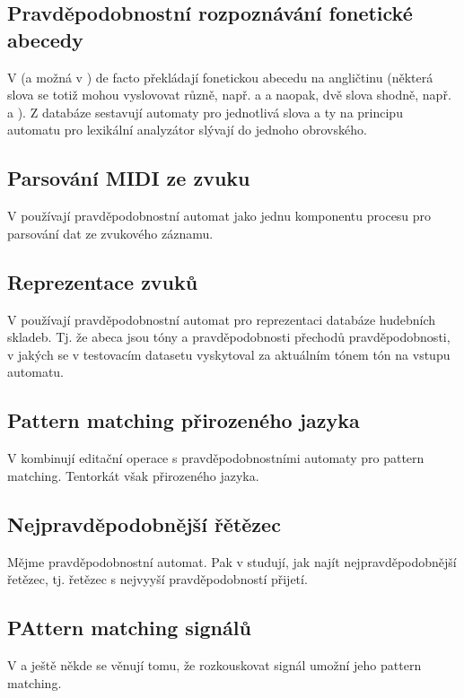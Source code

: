 \documentclass[a4paper,10pt]{article}
\begin{document}
\subsection{Pravděpodobnostní rozpoznávání fonetické abecedy}
V \cite{MohPerRoe-WeiFinStaTraSpeRec} (a možná v \cite{BahJel-DecChaWinDelSubApSpeRec}) de facto překládají fonetickou abecedu na angličtinu (některá slova se totiž mohou vyslovovat  různě, např.  a  a naopak, dvě slova shodně, např.  a ). Z databáze sestavují automaty pro jednotlivá slova a ty na principu automatu pro lexikální analyzátor slývají do jednoho obrovského.

\subsection{Parsování MIDI ze zvuku}
V \cite{ForBel-GenMusAccUsFinStaTra} používají pravděpodobnostní automat jako jednu komponentu procesu pro parsování  dat ze zvukového záznamu.

\subsection{Reprezentace zvuků}
V \cite{OliWag-ComMusNeuNetProFiStMa} používají pravděpodobnostní automat pro reprezentaci databáze hudebních skladeb. Tj. že abeca jsou tóny a pravděpodobnosti přechodů pravděpodobnosti, v jakých se v testovacím datasetu vyskytoval za aktuálním tónem tón na vstupu automatu.



\subsection{Pattern matching přirozeného jazyka}
V \cite{WaMan-ProFiStMaRegBaMTEva} kombinují editační operace s pravděpodobnostními automaty pro pattern matching. Tentorkát však přirozeného jazyka.

\subsection{Nejpravděpodobnější řětězec}
Mějme pravděpodobnostní automat. Pak v \cite{HigOnc-ComMosProStrProFiStaMa} studují, jak najít nejpravděpodobnější řetězec, tj. řetězec s nejvyyší pravděpodobností přijetí.

\subsection{PAttern matching signálů}
V \cite{MukRay-StaSplMerProbFiStaAuSigRepAna} a ještě někde se věnují tomu, že rozkouskovat signál umožní jeho pattern matching.
\end{document}
